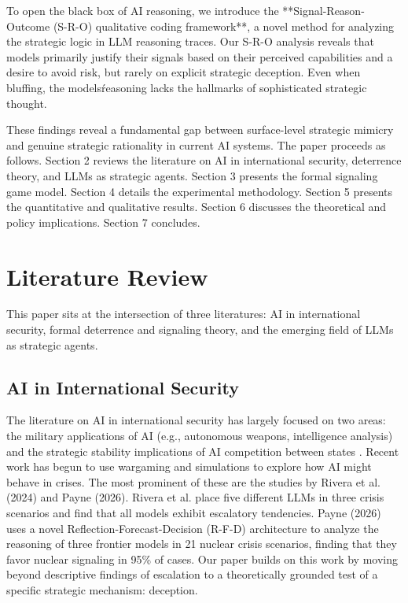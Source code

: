 \documentclass[12pt]{article}
\theoremstyle{plain}
\theoremstyle{definition}
\begin{document}
To open the black box of AI reasoning, we introduce the **Signal-Reason-Outcome (S-R-O) qualitative coding framework**, a novel method for analyzing the strategic logic in LLM reasoning traces. Our S-R-O analysis reveals that models primarily justify their signals based on their perceived capabilities and a desire to avoid risk, but rarely on explicit strategic deception. Even when bluffing, the models\' reasoning lacks the hallmarks of sophisticated strategic thought.

These findings reveal a fundamental gap between surface-level strategic mimicry and genuine strategic rationality in current AI systems. The paper proceeds as follows. Section 2 reviews the literature on AI in international security, deterrence theory, and LLMs as strategic agents. Section 3 presents the formal signaling game model. Section 4 details the experimental methodology. Section 5 presents the quantitative and qualitative results. Section 6 discusses the theoretical and policy implications. Section 7 concludes.

\section{Literature Review}

This paper sits at the intersection of three literatures: AI in international security, formal deterrence and signaling theory, and the emerging field of LLMs as strategic agents.

\subsection{AI in International Security}

The literature on AI in international security has largely focused on two areas: the military applications of AI (e.g., autonomous weapons, intelligence analysis) and the strategic stability implications of AI competition between states \citep{Horowitz2016, Johnson2020}. Recent work has begun to use wargaming and simulations to explore how AI might behave in crises. The most prominent of these are the studies by Rivera et al. (2024) and Payne (2026). Rivera et al. place five different LLMs in three crisis scenarios and find that all models exhibit escalatory tendencies. Payne (2026) uses a novel Reflection-Forecast-Decision (R-F-D) architecture to analyze the reasoning of three frontier models in 21 nuclear crisis scenarios, finding that they favor nuclear signaling in 95\% of cases. Our paper builds on this work by moving beyond descriptive findings of escalation to a theoretically grounded test of a specific strategic mechanism: deception.
\end{document}
